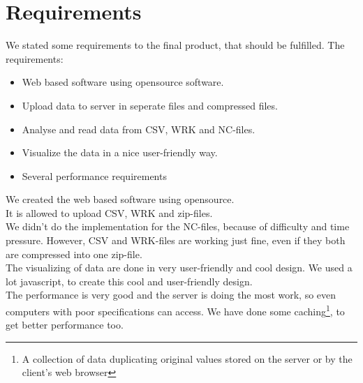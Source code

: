\chapter{Requirements}
We stated some requirements to the final product, that should be fulfilled. 
The requirements:
\begin{itemize}
\item Web based software using opensource software.
\item Upload data to server in seperate files and compressed files.
\item Analyse and read data from CSV, WRK and NC-files.
\item Visualize the data in a nice user-friendly way.
\item Several performance requirements
\end{itemize}
We created the web based software using opensource.\\
It is allowed to upload CSV, WRK and zip-files.\\
We didn't do the implementation for the NC-files, because of difficulty and time pressure. However, CSV and WRK-files are working just fine, even if they both are compressed into one zip-file.\\
The visualizing of data are done in very user-friendly and cool design. We used a lot javascript, to create this cool and user-friendly design.\\
The performance is very good and the server is doing the most work, so even computers with poor specifications can access. We have done some caching\footnote{A collection of data duplicating original values stored on the server or by the client's web browser}, to get better performance too.\\

